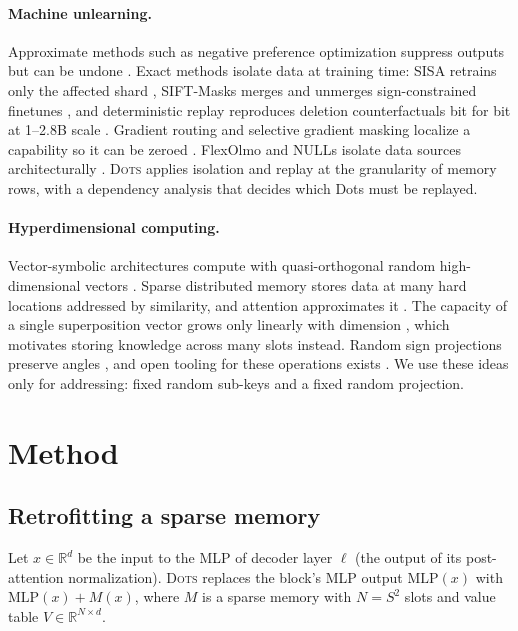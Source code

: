 \documentclass[10pt]{article}
\newcommand{\sys}{\textsc{Dots}}
\begin{document}
\paragraph{Machine unlearning.} Approximate methods such as negative preference optimization \citep{zhang2024npo} suppress outputs but can be undone \citep{zhang2025quant}. Exact methods isolate data at training time: SISA retrains only the affected shard \citep{bourtoule2021sisa}, SIFT-Masks merges and unmerges sign-constrained finetunes \citep{kuo2025sift}, and deterministic replay reproduces deletion counterfactuals bit for bit at 1--2.8B scale \citep{x2025trace}. Gradient routing and selective gradient masking localize a capability so it can be zeroed \citep{cloud2024gradient,shilov2025sgtm}. FlexOlmo and NULLs isolate data sources architecturally \citep{shi2025flexolmo,ghosal2026nulls}. \sys{} applies isolation and replay at the granularity of memory rows, with a dependency analysis that decides which Dots must be replayed.

\paragraph{Hyperdimensional computing.} Vector-symbolic architectures compute with quasi-orthogonal random high-dimensional vectors \citep{plate1995hrr,kanerva2009hdc}. Sparse distributed memory \citep{kanerva1988sdm} stores data at many hard locations addressed by similarity, and attention approximates it \citep{bricken2021attention}. The capacity of a single superposition vector grows only linearly with dimension \citep{frady2018theory}, which motivates storing knowledge across many slots instead. Random sign projections preserve angles \citep{charikar2002simhash}, and open tooling for these operations exists \citep{heddes2023torchhd}. We use these ideas only for addressing: fixed random sub-keys and a fixed random projection.

\section{Method}

\subsection{Retrofitting a sparse memory}
\label{sec:retrofit}

Let $x \in \mathbb{R}^{d}$ be the input to the MLP of decoder layer $\ell$ (the output of its post-attention normalization). \sys{} replaces the block's MLP output $\mathrm{MLP}(x)$ with $\mathrm{MLP}(x) + M(x)$, where $M$ is a sparse memory with $N = S^2$ slots and value table $V \in \mathbb{R}^{N \times d}$.
\end{document}

